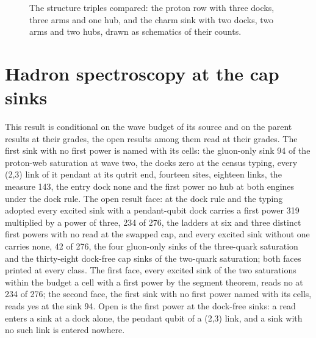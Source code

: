 \begin{chproof}
\begin{figure}[h]
\caption{The structure triples compared: the proton row with three docks, three arms and one hub, and the charm sink with two docks, two arms and two hubs, drawn as schematics of their counts.}\end{figure}
\end{chproof}
\section{Hadron spectroscopy at the cap sinks}\label{mod:VII-6-D540002-w-hadx}
\begin{chwall}\label{box:VII-6-D540002-w-hadx:1}
This result is conditional on the wave budget of its source and on the parent results at their grades, the open results among them read at their grades. The first sink with no first power is named with its cells: the gluon-only sink 94 of the proton-web saturation at wave two, the docks zero at the census typing, every (2,3) link of it pendant at its qutrit end, fourteen sites, eighteen links, the measure 143, the entry dock none and the first power no hub at both engines under the dock rule. The open result face: at the dock rule and the typing adopted every excited sink with a pendant-qubit dock carries a first power 319 multiplied by a power of three, 234 of 276, the ladders at six and three distinct first powers with no read at the swapped cap, and every excited sink without one carries none, 42 of 276, the four gluon-only sinks of the three-quark saturation and the thirty-eight dock-free cap sinks of the two-quark saturation; both faces printed at every class.
The first face, every excited sink of the two saturations within the budget a cell with a first power by the segment theorem, reads no at 234 of 276; the second face, the first sink with no first power named with its cells, reads yes at the sink 94. Open is the first power at the dock-free sinks: a read enters a sink at a dock alone, the pendant qubit of a (2,3) link, and a sink with no such link is entered nowhere.
\end{chwall}
